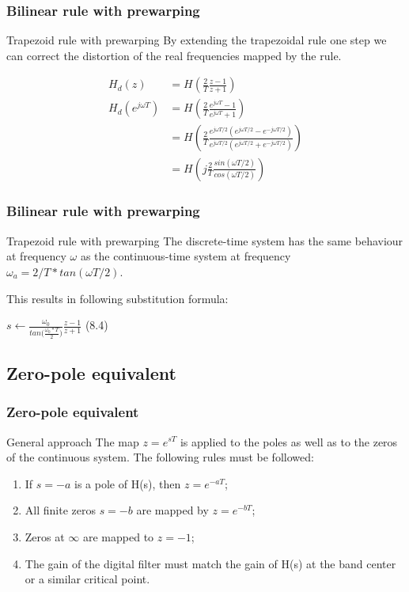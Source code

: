 \begin{frame}
	\frametitle{Bilinear rule with prewarping}
	\begin{block}{Trapezoid rule with prewarping}
		By extending the trapezoidal rule one step we can correct the distortion of the real frequencies mapped by the rule.
		\vspace{-2em} 
		\begin{center}
			\begin{align*}
			H_d(z) &= H(\frac{2}{T} \frac{z-1}{z+1})\\
			H_d(e^{j\omega T}) &= H(\frac{2}{T} \frac{e^{j\omega T}-1}{e^{j\omega T}+1})\\
			&= H(\frac{2}{T} \frac{e^{j\omega T/2} (e^{j\omega T/2} - e^{-j\omega T/2})}{e^{j\omega T/2}(e^{j\omega T/2} + e^{-j\omega T/2})})\\
			&= H(j \frac{2}{T} \frac{sin(\omega T/2)}{cos(\omega T/2)})
			\end{align*}
		\end{center}
	\end{block}
\end{frame}

\begin{frame}
	\frametitle{Bilinear rule with prewarping}
	\begin{block}{Trapezoid rule with prewarping}
		The discrete-time system has the same behaviour at frequency $\omega$ as the continuous-time system at frequency $\omega_a = 2/T * tan(\omega T/2)$.
		
		This results in following substitution formula:
		\begin{center}
			$s \gets \frac{\omega_0}{tan\big(\frac{\omega_0 * T}{2}\big)} \frac{z-1}{z+1}$ (8.4)
		\end{center}
	\end{block}
\end{frame}

\subsection{Zero-pole equivalent}

\begin{frame}
	\frametitle{Zero-pole equivalent}
	\begin{block}{General approach}
		The map $z = e^{sT}$ is applied to the poles as well as to the zeros of the continuous system. The following rules must be followed:
		\begin{enumerate}
			\item If $s=-a$ is a pole of H(s), then $z=e^{-aT}$;
			\item All finite zeros $s=-b$ are mapped by $z = e^{-bT}$;
			\item Zeros at $\infty$ are mapped to $z = -1$;
			\item The gain of the digital filter must match the gain of H(s) at the band center or a similar critical point.
		\end{enumerate}
	\end{block}
\end{frame}

